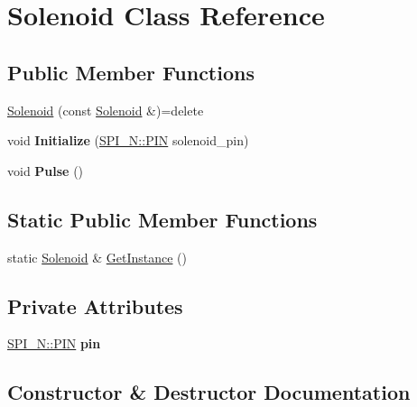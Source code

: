 \hypertarget{class_solenoid}{}\section{Solenoid Class Reference}
\label{class_solenoid}
\subsection*{Public Member Functions}
\begin{DoxyCompactItemize}
\item 
\hyperlink{class_solenoid_a6e9f8ce2b5b09ea3f587b83dc7c7ee36}{Solenoid} (const \hyperlink{class_solenoid}{Solenoid} \&)=delete
\item 
void {\bfseries Initialize} (\hyperlink{struct_s_p_i___n_1_1_p_i_n}{S\+P\+I\+\_\+\+N\+::\+P\+IN} solenoid\+\_\+pin)\hypertarget{class_solenoid_ac1b0c6024b8120b8d1dfc446f454ce3b}{}\label{class_solenoid_ac1b0c6024b8120b8d1dfc446f454ce3b}

\item 
void {\bfseries Pulse} ()\hypertarget{class_solenoid_a50bc0121679bd1ff11323f1c88fe2ec6}{}\label{class_solenoid_a50bc0121679bd1ff11323f1c88fe2ec6}

\end{DoxyCompactItemize}
\subsection*{Static Public Member Functions}
\begin{DoxyCompactItemize}
\item 
static \hyperlink{class_solenoid}{Solenoid} \& \hyperlink{class_solenoid_adc5bf799e0eb382eb6a5e4d471308f20}{Get\+Instance} ()
\end{DoxyCompactItemize}
\subsection*{Private Attributes}
\begin{DoxyCompactItemize}
\item 
\hyperlink{struct_s_p_i___n_1_1_p_i_n}{S\+P\+I\+\_\+\+N\+::\+P\+IN} {\bfseries pin}\hypertarget{class_solenoid_a1a6fef2de8c051a885472b6302cc5f7c}{}\label{class_solenoid_a1a6fef2de8c051a885472b6302cc5f7c}

\end{DoxyCompactItemize}


\subsection{Constructor \& Destructor Documentation}

